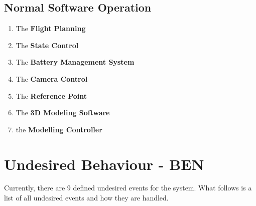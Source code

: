 \documentclass[10pt,letterpaper]{article}
\begin{document}
\subsection{Normal Software Operation}
	\begin{enumerate}[label=\textbf{NS\arabic*}]
    
        \item The \textbf{Flight Planning} 
        	
        \item The \textbf{State Control}
        
        \item The \textbf{Battery Management System}
        
        \item The \textbf{Camera Control}
        
        \item The \textbf{Reference Point}
               
        \item The \textbf{3D Modeling Software}
        
        \item the \textbf{Modelling Controller}
        
    \end{enumerate}
    
    


\newpage


\section{Undesired Behaviour - BEN}
Currently, there are 9 defined undesired events for the system. What follows is a list of all undesired events and how they are handled.
\end{document}
